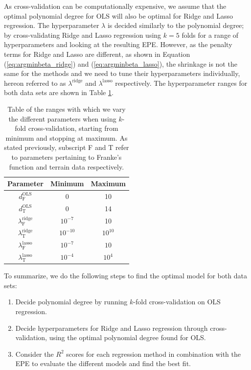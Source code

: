\documentclass[a4paper, 10pt]{article}
\begin{document}
\begin{multicols}{2}
As cross-validation can be computationally expensive, we assume that the optimal polynomial degree for OLS will also be optimal for Ridge and Lasso regression. The hyperparameter $\lambda$ is decided similarly to the polynomial degree; by cross-validating  Ridge and Lasso regression using $k=5$ folds for a range of hyperparameters and looking at the resulting EPE. However, as the penalty terms for Ridge and Lasso are different, as shown in Equation (\ref{eq:argminbeta_ridge}) and (\ref{eq:argminbeta_lasso}), the shrinkage is not the same for the methods and we need to tune their hyperparameters individually, hereon referred to as $\lambda^\text{ridge}$ and $\lambda^\text{lasso}$ respectively. The hyperparameter ranges for both data sets  are shown in Table \ref{tab:parameters_kfold}.
\begin{table}[H]
\caption{Table of the ranges with which we vary the different parameters when using $k$-fold cross-validation, starting from minimum and stopping at maximum. As stated previously, subscript F and T refer  to parameters pertaining to Franke's function and terrain data respectively.}
\label{tab:parameters_kfold}
\centering
{\setlength{\extrarowheight}{1pt}
\begin{tabular}{| c | c | c |} \hline
Parameter & Minimum & Maximum  \\ \hline
$d_\text{F}^\text{OLS}$ & 0 & 10 \\ \hline
$d_\text{T}^\text{OLS}$ & 0 & 14 \\ \hline
$\lambda^\text{ridge}_\text{F}$  & $10^{-7}$ & 10\\ \hline
$\lambda^\text{ridge}_\text{T}$ & $10^{-10}$ & $10^{10}$\\ \hline
$\lambda^\text{lasso}_\text{F}$  & $10^{-7}$ & $10$\\ \hline
$\lambda^\text{lasso}_\text{T}$ & $10^{-4}$ & $10^{4}$\\ \hline
\end{tabular}}
\end{table}
\noindent
To summarize, we do the following steps to find the optimal model for both data sets:
\begin{enumerate}
\item Decide polynomial degree by running $k$-fold cross-validation on OLS regression.
\item Decide hyperparameters for Ridge and Lasso regression through cross-validation, using the optimal polynomial degree found for OLS.
\item Consider the $R^2$ scores for each regression method in combination with the EPE to evaluate the different models and find the best fit.
\end{enumerate}







\end{multicols}
\end{document}
